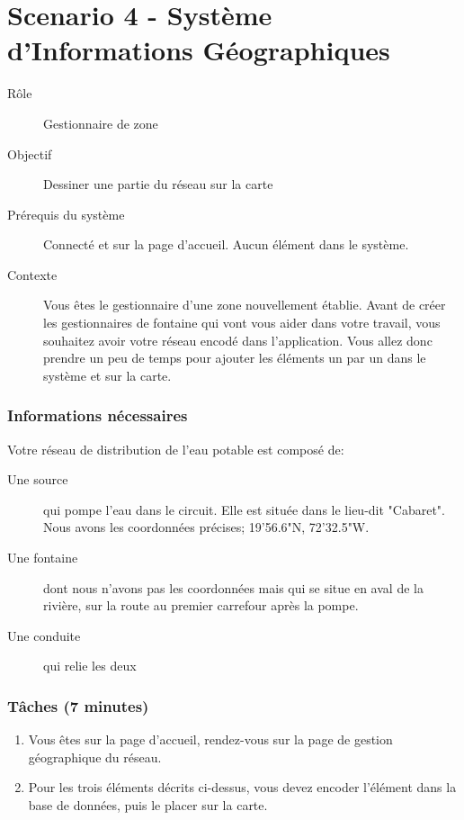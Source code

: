 \documentclass[a4paper, 11pt]{article}
\begin{document}
\section*{Scenario 4 - Système d'Informations Géographiques}
    \begin{description}
        \item[Rôle] Gestionnaire de zone
        \item[Objectif] Dessiner une partie du réseau sur la carte
        \item[Prérequis du système] Connecté et sur la page d'accueil. Aucun élément dans le système.
        \item[Contexte] Vous êtes le gestionnaire d'une zone nouvellement établie. Avant de créer les gestionnaires de fontaine qui vont vous aider dans votre travail, vous souhaitez avoir votre réseau encodé dans l'application. Vous allez donc prendre un peu de temps pour ajouter les éléments un par un dans le système et sur la carte.
    \end{description}

    \subsubsection*{Informations nécessaires}
        Votre réseau de distribution de l'eau potable est composé de:
        \begin{description}
            \item[Une source] qui pompe l'eau dans le circuit. Elle est située dans le lieu-dit "Cabaret". Nous avons les coordonnées précises; 19'56.6"N, 72'32.5"W.
            \item[Une fontaine] dont nous n'avons pas les coordonnées mais qui se situe en aval de la rivière, sur la route au premier carrefour après la pompe.
            \item[Une conduite] qui relie les deux
        \end{description}

    \subsubsection*{Tâches (7 minutes)}
        \begin{enumerate}
            \item Vous êtes sur la page d'accueil, rendez-vous sur la page de gestion géographique du réseau.
            \item Pour les trois éléments décrits ci-dessus, vous devez encoder l'élément dans la base de données, puis le placer sur la carte.
        \end{enumerate}
\end{document}
